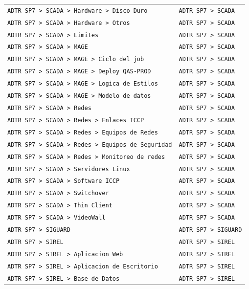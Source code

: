 \begin{longtable}{>{\raggedright\arraybackslash}p{} >{\raggedright\arraybackslash}p{}}
\texttt{ADTR SP7 > SCADA > Hardware > Disco Duro} & \texttt{ADTR SP7 > SCADA} \\
\texttt{ADTR SP7 > SCADA > Hardware > Otros} & \texttt{ADTR SP7 > SCADA} \\
\texttt{ADTR SP7 > SCADA > Limites} & \texttt{ADTR SP7 > SCADA} \\
\texttt{ADTR SP7 > SCADA > MAGE} & \texttt{ADTR SP7 > SCADA} \\
\texttt{ADTR SP7 > SCADA > MAGE > Ciclo del job} & \texttt{ADTR SP7 > SCADA} \\
\texttt{ADTR SP7 > SCADA > MAGE > Deploy QAS-PROD} & \texttt{ADTR SP7 > SCADA} \\
\texttt{ADTR SP7 > SCADA > MAGE > Logica de Estilos} & \texttt{ADTR SP7 > SCADA} \\
\texttt{ADTR SP7 > SCADA > MAGE > Modelo de datos} & \texttt{ADTR SP7 > SCADA} \\
\texttt{ADTR SP7 > SCADA > Redes} & \texttt{ADTR SP7 > SCADA} \\
\texttt{ADTR SP7 > SCADA > Redes > Enlaces ICCP} & \texttt{ADTR SP7 > SCADA} \\
\texttt{ADTR SP7 > SCADA > Redes > Equipos de Redes} & \texttt{ADTR SP7 > SCADA} \\
\texttt{ADTR SP7 > SCADA > Redes > Equipos de Seguridad} & \texttt{ADTR SP7 > SCADA} \\
\texttt{ADTR SP7 > SCADA > Redes > Monitoreo de redes} & \texttt{ADTR SP7 > SCADA} \\
\texttt{ADTR SP7 > SCADA > Servidores Linux} & \texttt{ADTR SP7 > SCADA} \\
\texttt{ADTR SP7 > SCADA > Software ICCP} & \texttt{ADTR SP7 > SCADA} \\
\texttt{ADTR SP7 > SCADA > Switchover} & \texttt{ADTR SP7 > SCADA} \\
\texttt{ADTR SP7 > SCADA > Thin Client} & \texttt{ADTR SP7 > SCADA} \\
\texttt{ADTR SP7 > SCADA > VideoWall} & \texttt{ADTR SP7 > SCADA} \\
\texttt{ADTR SP7 > SIGUARD} & \texttt{ADTR SP7 > SIGUARD} \\
\texttt{ADTR SP7 > SIREL} & \texttt{ADTR SP7 > SIREL} \\
\texttt{ADTR SP7 > SIREL > Aplicacion Web} & \texttt{ADTR SP7 > SIREL} \\
\texttt{ADTR SP7 > SIREL > Aplicacion de Escritorio} & \texttt{ADTR SP7 > SIREL} \\
\texttt{ADTR SP7 > SIREL > Base de Datos} & \texttt{ADTR SP7 > SIREL} \\

\end{longtable}
